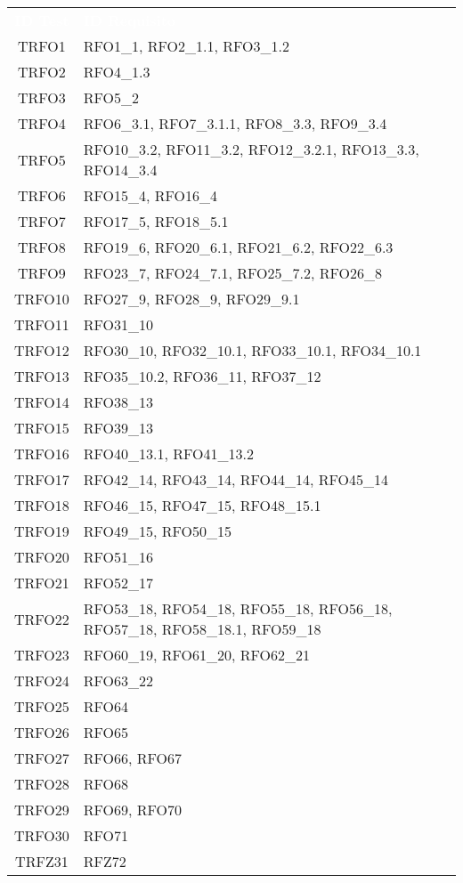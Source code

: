 \begin{longtable}{|c| C{10cm}|} 
	\textcolor{white}{\textbf{ID Test}}&
	\textcolor{white}{\textbf{ID Requisito}}\\
	
	TRFO1 & RFO1\_1, RFO2\_1.1, RFO3\_1.2 \\ \hline
	TRFO2 & RFO4\_1.3 \\ \hline
	TRFO3 & RFO5\_2 \\ \hline
	TRFO4 & RFO6\_3.1, RFO7\_3.1.1, RFO8\_3.3, RFO9\_3.4 \\ \hline
	TRFO5 & RFO10\_3.2, RFO11\_3.2, RFO12\_3.2.1, RFO13\_3.3, RFO14\_3.4 \\ \hline
	TRFO6 & RFO15\_4, RFO16\_4 \\ \hline
	TRFO7 & RFO17\_5, RFO18\_5.1 \\ \hline
	TRFO8 & RFO19\_6, RFO20\_6.1, RFO21\_6.2, RFO22\_6.3 \\ \hline
	TRFO9 & RFO23\_7, RFO24\_7.1, RFO25\_7.2, RFO26\_8 \\ \hline
	TRFO10 & RFO27\_9, RFO28\_9, RFO29\_9.1 \\ \hline
	TRFO11 & RFO31\_10 \\ \hline
	TRFO12 & RFO30\_10, RFO32\_10.1, RFO33\_10.1, RFO34\_10.1 \\ \hline
	TRFO13 & RFO35\_10.2, RFO36\_11, RFO37\_12 \\ \hline
	TRFO14 & RFO38\_13 \\ \hline
	TRFO15 & RFO39\_13 \\ \hline
	TRFO16 & RFO40\_13.1, RFO41\_13.2 \\ \hline
	TRFO17 & RFO42\_14, RFO43\_14, RFO44\_14, RFO45\_14 \\ \hline
	TRFO18 & RFO46\_15, RFO47\_15, RFO48\_15.1 \\ \hline
	TRFO19 & RFO49\_15, RFO50\_15 \\ \hline
	TRFO20 & RFO51\_16 \\ \hline
	TRFO21 & RFO52\_17 \\ \hline
	TRFO22 & RFO53\_18, RFO54\_18, RFO55\_18, RFO56\_18, RFO57\_18, RFO58\_18.1, RFO59\_18 \\ \hline
	TRFO23 & RFO60\_19, RFO61\_20, RFO62\_21 \\ \hline
	TRFO24 & RFO63\_22 \\ \hline
	TRFO25 & RFO64 \\ \hline
	TRFO26 & RFO65 \\ \hline
	TRFO27 & RFO66, RFO67 \\ \hline
	TRFO28 & RFO68 \\ \hline
	TRFO29 & RFO69, RFO70 \\ \hline
	TRFO30 & RFO71 \\ \hline
	TRFZ31 & RFZ72 \\ \hline
\end{longtable} 
\newpage
